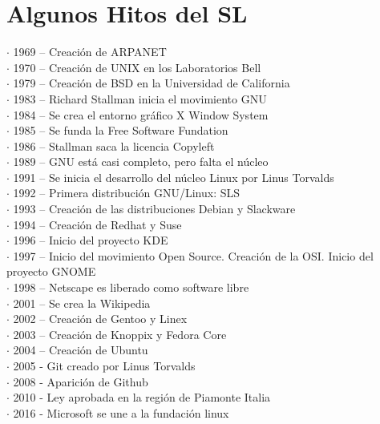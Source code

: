 \section{Algunos Hitos del SL}

\begin{description}
\item[$\cdot$ 1969 – Creación de ARPANET]
\item[$\cdot$ 1970 – Creación de UNIX en los Laboratorios Bell]
\item[$\cdot$ 1979 – Creación de BSD en la Universidad de California]
\item[$\cdot$ 1983 – Richard Stallman inicia el movimiento GNU]
\item[$\cdot$ 1984 – Se crea el entorno gráfico X Window System]
\item[$\cdot$ 1985 – Se funda la Free Software Fundation]
\item[$\cdot$ 1986 – Stallman saca la licencia Copyleft]
\item[$\cdot$ 1989 – GNU está casi completo, pero falta el núcleo]
\item[$\cdot$ 1991 – Se inicia el desarrollo del núcleo Linux por Linus Torvalds]
\item[$\cdot$ 1992 – Primera distribución GNU/Linux: SLS]
\item[$\cdot$ 1993 – Creación de las distribuciones Debian y Slackware]
\item[$\cdot$ 1994 – Creación de Redhat y Suse]
\item[$\cdot$ 1996 – Inicio del proyecto KDE]
\item[$\cdot$ 1997 – Inicio del movimiento Open Source. Creación de la OSI. Inicio del proyecto GNOME]
\item[$\cdot$ 1998 – Netscape es liberado como software libre]
\item[$\cdot$ 2001 – Se crea la Wikipedia]
\item[$\cdot$ 2002 – Creación de Gentoo y Linex]
\item[$\cdot$ 2003 – Creación de Knoppix y Fedora Core]
\item[$\cdot$ 2004 – Creación de Ubuntu]
\item[$\cdot$ 2005 - Git creado por Linus Torvalds]
\item[$\cdot$ 2008 - Aparición de Github]
\item[$\cdot$ 2010 - Ley aprobada en la región de Piamonte Italia]
\item[$\cdot$ 2016 - Microsoft se une a la fundación linux]
\end{description}

